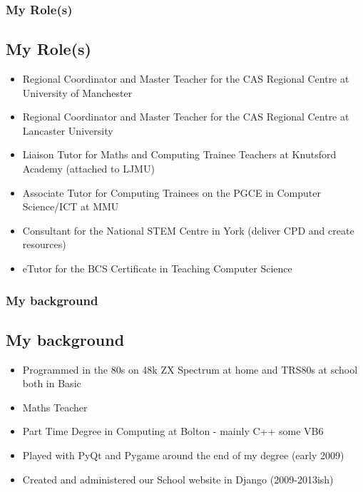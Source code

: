 \documentclass{beamer}
\begin{document}
\begin{frame}
\frametitle{My Role(s)}
\subsection{My Role(s)}
\begin{itemize}
\item Regional Coordinator and Master Teacher for the CAS Regional Centre at University of Manchester
  \pause
\item Regional Coordinator and Master Teacher for the CAS Regional Centre at Lancaster University
  \pause
\item Liaison Tutor for Maths and Computing Trainee Teachers at Knutsford Academy (attached to LJMU)
  \pause
\item Associate Tutor for Computing Trainees on the PGCE in Computer Science/ICT at MMU
  \pause
\item Consultant for the National STEM Centre in York (deliver CPD and create resources)
  \pause
\item eTutor for the BCS Certificate in Teaching Computer Science
  \pause 
\end{itemize}
\end{frame}


\begin{frame}
\frametitle{My background}
\subsection{My background}

\begin{itemize}
  \pause
\item Programmed in the 80s on 48k ZX Spectrum at home and TRS80s at school both in Basic
  \pause
\item Maths Teacher
  \pause
\item Part Time Degree in Computing at Bolton - mainly C++ some VB6
  \pause
\item Played with PyQt and Pygame around the end of my degree (early 2009)
  \pause
\item Created and administered our School website in Django (2009-2013ish)
\end{itemize}

\end{frame}
\end{document}
